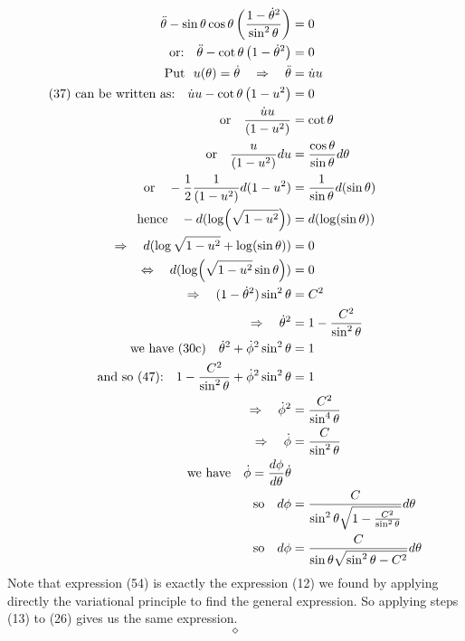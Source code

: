 \begin{align}
\ddot{\theta} - \sin\theta\cos\theta\left(\frac{1 - \dot{\theta}^2}{\sin^2\theta}\right)&= 0\\
\text{or:}\quad \ddot{\theta} - \cot\theta\left( 1-\dot{\theta}^2\right) &= 0\\
\text{Put }\ u(\theta)= \dot{\theta}\quad\Rightarrow\quad \ddot{\theta} &= \dot{u}u\\
\text{(37) can be written as:}\quad \dot{u}u - \cot\theta\left( 1-u^2\right) &= 0\\
\text{or}\quad \frac{\dot{u}u}{\left( 1-u^2\right)} &= \cot\theta\\
\text{or}\quad \frac{u}{\left( 1-u^2\right)}du &= \frac{\cos\theta}{\sin\theta} d\theta\\
\text{or}\quad -\frac{1}{2}\frac{1}{\left( 1-u^2\right)}d(1-u^2) &= \frac{1}{\sin \theta} d(\sin\theta)\\
\text{hence}\quad -d(\log (\sqrt{1-u^2})) &= d(\log(\sin\theta))\\
\Rightarrow \quad d(\log \sqrt{1-u^2} +\log(\sin\theta))&=0\\
\Leftrightarrow \quad d(\log( \sqrt{1-u^2}\sin\theta))&=0\\
\Rightarrow \quad (1-\dot{\theta}^2)\sin^2\theta &= C^2\\
\Rightarrow \quad \dot{\theta}^2&= 1-\frac{C^2}{\sin^2\theta}\\
\text{we have (30c)}\quad \dot{\theta}^2+\dot{\phi}^2\sin^2\theta &= 1\\
\text{and so (47):}\quad 1-\frac{C^2}{\sin^2\theta}+\dot{\phi}^2\sin^2\theta &= 1\\
\Rightarrow \quad \dot{\phi}^2 &= \frac{C^2}{\sin^4\theta}\\
\Rightarrow \quad \dot{\phi} &= \frac{C}{\sin^2\theta}\\
\text{we have} \quad \dot{\phi}=\dv{\phi}{\theta}\dot{\theta}\\
\text{so} \quad d\phi  &= \frac{C}{\sin^2\theta\sqrt{1-\frac{C^2}{\sin^2\theta}}}d\theta\\
\text{so} \quad d\phi  &= \frac{C}{\sin\theta\sqrt{\sin^2\theta-C^2}}d\theta
\end{align}
Note that expression (54) is exactly the expression (12) we found by applying directly the variational principle to find the general expression. So applying steps (13) to (26) gives us the same expression.
$$\diamond$$
\newpage

